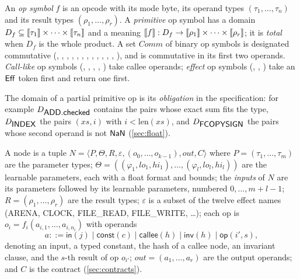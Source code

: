 \begin{definition}[Op symbols]\label{def:opsym}
An \emph{op symbol} $f$ is an opcode with its mode byte, its operand types
$(\tau_1,\dots,\tau_{n})$ and its result types $(\rho_1,\dots,\rho_{r})$. A \emph{primitive}
op symbol has a domain $D_f\subseteq\llbracket \tau_1 \rrbracket\times\dots\times\llbracket \tau_n \rrbracket$ and a meaning
$\llbracket f \rrbracket: D_f\to\llbracket \rho_1 \rrbracket\times\dots\times\llbracket \rho_r \rrbracket$; it is \emph{total} when $D_f$ is the
whole product. A set $\mathit{Comm}$ of binary op symbols is designated commutative
(, , , , , , , , ,
, , , ), and  is commutative in its first two
operands. \emph{Call-like} op symbols (, , ,
, ) take callee operands; \emph{effect} op symbols
(, , ) take an $\mathsf{Eff}$ token first and return one
first.
\end{definition}

The domain of a partial primitive op is its \emph{obligation} in the specification: for
example $D_{\mbox{\textsf{ADD.checked}}}$ contains the pairs whose exact sum fits the type,
$D_{\mbox{\textsf{INDEX}}}$ the pairs $(xs,i)$ with $i<\mathrm{len}(xs)$, and $D_{\mbox{\textsf{FCOPYSIGN}}}$ the
pairs whose second operand is not $\mathsf{NaN}$ (\cref{sec:float}).

\begin{definition}[Nodes]\label{def:node}
A node is a tuple $N=\langle P,\Theta,R,\varepsilon,(o_0,\dots,o_{k-1}),\mathit{out},C\rangle$
where $P=(\tau_1,\dots,\tau_m)$ are the parameter types;
$\Theta=((\varphi_1,lo_1,hi_1),\dots,(\varphi_l,lo_l,hi_l))$ are the learnable parameters, each
with a float format and bounds; the \emph{inputs} of $N$ are its parameters followed by its
learnable parameters, numbered $0,\dots,m+l-1$; $R=(\rho_1,\dots,\rho_r)$ are the result types;
$\varepsilon$ is a subset of the twelve effect names (\textsf{ARENA}, \textsf{CLOCK},
\textsf{FILE\_READ}, \textsf{FILE\_WRITE}, \dots); each op is $o_i=f_i(a_{i,1},\dots,a_{i,n_i})$
with operands
\[
a ::= \mathsf{in}(j) \mid \mathsf{const}(c) \mid \mathsf{callee}(h) \mid \mathsf{inv}(h) \mid
\mathsf{op}(i',s),
\]
denoting an input, a typed constant, the hash of a callee node, an invariant clause, and the
$s$-th result of op $o_{i'}$; $\mathit{out}=(a_1,\dots,a_r)$ are the output operands; and $C$
is the contract (\cref{sec:contracts}).
\end{definition}

